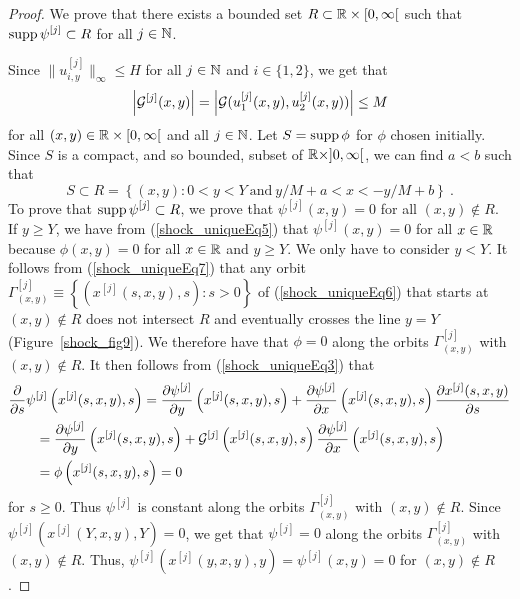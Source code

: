 \begin{proof}

 We prove that there exists a bounded set
$R \subset \RR \times [0,\infty[$ such that
$\displaystyle \supp \psi^{[j]} \subset R$ for all $j \in \NN$.

Since $\displaystyle \|u_{i,y}^{[j]} \|_\infty \leq H$ for all
$j \in \NN$ and $i \in \{1,2\}$, we get that
\begin{equation} \label{shock_uniqueEq7}
\left| {\cal G}^{[j]}(x,y) \right|
= \left|{\cal G}(u^{[j]}_1(x,y),u^{[j]}_2(x,y))\right|
\leq M
\end{equation}
for all $(x,y) \in \RR \times [0,\infty[$ and all $j \in \NN$.
Let $S = \supp \phi$ for $\phi$ chosen initially.  Since $S$ is a
compact, and so bounded, subset of $\RR\times ]0,\infty[$, we can find
$a < b$ such that
\[
S \subset R = \left\{ (x,y) : 0 < y < Y \ \text{and} \
y/M + a < x < -y/M + b \right\} \ .
\]
To prove that $\displaystyle \supp \psi^{[j]} \subset R$, we prove
that $\displaystyle \psi^{[j]}(x,y) = 0$ for all $(x,y) \not\in R$.
If $y \geq Y$, we have from (\ref{shock_uniqueEq5}) that
$\displaystyle \psi^{[j]}(x,y) = 0$ for all $x \in \RR$
because $\phi(x,y) =0$ for all $x\in \RR$ and $y \geq Y$.  We only have
to consider $y<Y$.  It follows from (\ref{shock_uniqueEq7}) that
any orbit
$\displaystyle \Gamma_{(x,y)}^{[j]}
\equiv \left\{ \left(x^{[j]}(s,x,y),s\right) : s > 0 \right\}$
of (\ref{shock_uniqueEq6}) that starts at $(x,y) \not\in R$
does not intersect $R$ and eventually crosses the line $y=Y$
(Figure~\ref{shock_fig9}).  We
therefore have that $\phi = 0$ along the orbits
$\displaystyle \Gamma_{(x,y)}^{[j]}$ with $(x,y) \not\in R$.
It then follows from (\ref{shock_uniqueEq3}) that
\begin{align}
&\pdfdx{\psi^{[j]}\left(x^{[j]}(s,x,y),s\right)}{s}
= \pdydx{\psi^{[j]}}{y}\left(x^{[j]}(s,x,y),s\right)
+ \pdydx{\psi^{[j]}}{x}\left(x^{[j]}(s,x,y),s\right) \pdydx{x^{[j]}(s,x,y)}{s}
\nonumber \\
&\qquad = \pdydx{\psi^{[j]}}{y}\left(x^{[j]}(s,x,y),s\right)
+ {\cal G}^{[j]}\left(x^{[j]}(s,x,y),s\right)
\pdydx{\psi^{[j]}}{x}\left(x^{[j]}(s,x,y),s\right) \nonumber \\
&\qquad = \phi\left(x^{[j]}(s,x,y),s\right) = 0 \label{shock_uniqueEq11}
\end{align}
for $s \geq 0$.  Thus $\displaystyle \psi^{[j]}$ is constant along the
orbits $\displaystyle \Gamma_{(x,y)}^{[j]}$ with $(x,y) \not\in R$.  Since\\
$\displaystyle \psi^{[j]}\left(x^{[j]}(Y,x,y),Y\right) = 0$,
we get that $\displaystyle \psi^{[j]} = 0$ along the orbits
$\displaystyle \Gamma_{(x,y)}^{[j]}$ with $(x,y) \not\in R$.  Thus,
$\displaystyle \psi^{[j]}\left(x^{[j]}(y,x,y),y\right) =
\psi^{[j]}\left(x,y\right) = 0$ for $(x,y) \not\in R$.


\end{proof}
